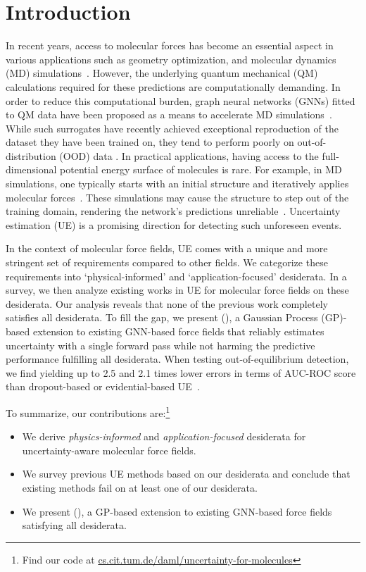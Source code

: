 \section{Introduction}
In recent years, access to molecular forces has become an essential aspect in various applications such as geometry optimization, and molecular dynamics (MD) simulations~\citep{jensenMolecularModelingBasics2010}.
However, the underlying quantum mechanical (QM) calculations required for these predictions are computationally demanding.
In order to reduce this computational burden, graph neural networks (GNNs) fitted to QM data have been proposed as a means to accelerate MD simulations~\citep{chmiela2017machine,schuttSchNetDeepLearning2018}.
While such surrogates have recently achieved exceptional reproduction of the dataset they have been trained on,  they tend to perform poorly on out-of-distribution (OOD) data \citep{li_out--distribution_2022}. In practical applications, having access to the full-dimensional potential energy surface of molecules is rare. For example, in MD simulations, one typically starts with an initial structure and iteratively applies molecular forces~\citep{hojaQM7XComprehensiveDataset2021}. These simulations may cause the structure to step out of the training domain, rendering the network's predictions unreliable~\citep{stockerHowRobustAre2022}.
Uncertainty estimation (UE) is a promising direction for detecting such unforeseen events.

In the context of molecular force fields, UE comes with a unique and more stringent set of requirements compared to other fields. We categorize these requirements into `physical-informed' and `application-focused' desiderata.
In a survey, we then analyze existing works in UE for molecular force fields on these desiderata.
Our analysis reveals that none of the previous work completely satisfies all desiderata.
To fill the gap, we present \ours{} (\oursacro{}), a Gaussian Process (GP)-based extension to existing GNN-based force fields that reliably estimates uncertainty with a single forward pass while not harming the predictive performance fulfilling all desiderata. 
When testing out-of-equilibrium detection, we find \oursacro{} yielding up to 2.5 and 2.1 times lower errors in terms of AUC-ROC score than dropout-based or evidential-based UE~\citep{gal2016dropout,soleimany2021evidential}.

To summarize, our contributions are:\footnote{Find our code at \href{https://www.cs.cit.tum.de/daml/uncertainty-estimation-for-molecules-desiderata-and-methods}{cs.cit.tum.de/daml/uncertainty-for-molecules}}
\begin{itemize}[noitemsep]
    \item We derive \emph{physics-informed} and \emph{application-focused} desiderata for uncertainty-aware molecular force fields.
    \item We survey previous UE methods based on our desiderata and conclude that existing methods fail on at least one of our desiderata.
    \item We present \ours{} (\oursacro{}), a GP-based extension to existing GNN-based force fields satisfying all desiderata.
\end{itemize}